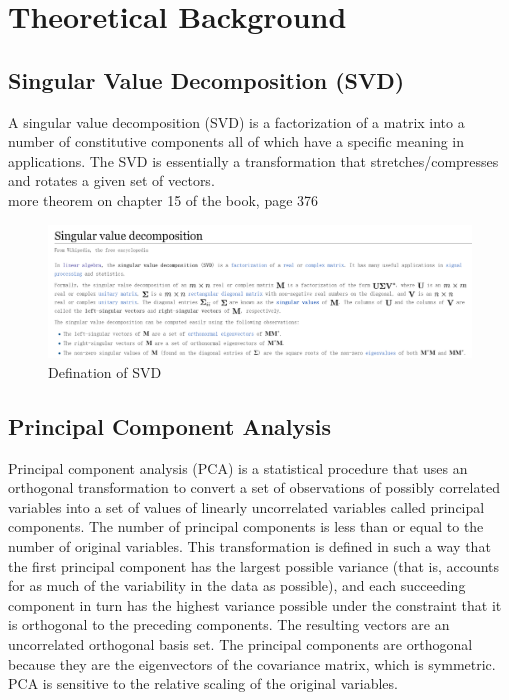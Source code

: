 \documentclass[12pt,letterpaper]{article}
\begin{document}
\section{Theoretical Background}

\subsection{Singular Value Decomposition (SVD)}
A singular value decomposition (SVD) is a factorization of a matrix into a number of constitutive
components all of which have a specific meaning in applications. The SVD is essentially a transformation that stretches/compresses and rotates a given set of vectors. \\
more theorem on chapter 15 of the book, page 376
\begin{figure}[h]
	\caption{Defination of SVD}
	\centering
	\includegraphics[width=1\textwidth]{1}
	\end{figure}
	
	\subsection{Principal Component Analysis}
	Principal component analysis (PCA) is a statistical procedure that uses an orthogonal transformation to convert a set of observations of possibly correlated variables into a set of values of linearly uncorrelated variables called principal components. The number of principal components is less than or equal to the number of original variables. This transformation is defined in such a way that the first principal component has the largest possible variance (that is, accounts for as much of the variability in the data as possible), and each succeeding component in turn has the highest variance possible under the constraint that it is orthogonal to the preceding components. The resulting vectors are an uncorrelated orthogonal basis set. The principal components are orthogonal because they are the eigenvectors of the covariance matrix, which is symmetric. PCA is sensitive to the relative scaling of the original variables.
\end{document}
